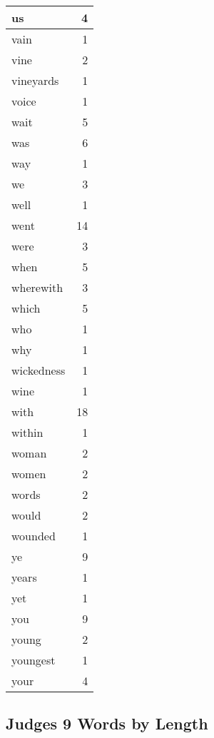 \begin{center}
\begin{longtable}{l|r}
us & 4\\ \hline 
vain & 1\\ \hline 
vine & 2\\ \hline 
vineyards & 1\\ \hline 
voice & 1\\ \hline 
wait & 5\\ \hline 
was & 6\\ \hline 
way & 1\\ \hline 
we & 3\\ \hline 
well & 1\\ \hline 
went & 14\\ \hline 
were & 3\\ \hline 
when & 5\\ \hline 
wherewith & 3\\ \hline 
which & 5\\ \hline 
who & 1\\ \hline 
why & 1\\ \hline 
wickedness & 1\\ \hline 
wine & 1\\ \hline 
with & 18\\ \hline 
within & 1\\ \hline 
woman & 2\\ \hline 
women & 2\\ \hline 
words & 2\\ \hline 
would & 2\\ \hline 
wounded & 1\\ \hline 
ye & 9\\ \hline 
years & 1\\ \hline 
yet & 1\\ \hline 
you & 9\\ \hline 
young & 2\\ \hline 
youngest & 1\\ \hline 
your & 4\\ \hline 
\end{longtable}
\end{center}





\subsection{Judges 9 Words by Length}


\normalsize
 
